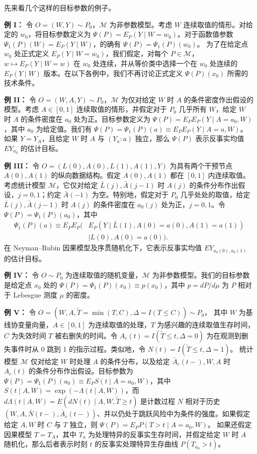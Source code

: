 先来看几个这样的目标参数的例子。

\noindent\textbf{例 I：}\enspace
令 $O=(W,Y)\sim P_0$，$\mathcal M$ 为非参数模型。考虑 $W$ 连续取值的情形。对给定的 $w_0$，将目标参数定义为
$\Psi(P)=E_P(Y\mid W=w_0)$。对于函数值参数
$\Psi_1(P)(W)=E_P(Y\mid W)$，的确有 $\Psi(P)=\Psi_1(P)(w_0)$。
为了在给定点 $w_0$ 处正式定义 $E_P(Y\mid W=w_0)$，我们假定，对每个 $P\in\mathcal M$，
$w\mapsto E_P(Y\mid W=w)$ 在 $w_0$ 处连续，并从等价类中选择一个在 $w_0$ 处连续的 $E_P(Y\mid W)$ 版本。在以下各例中，我们不再讨论正式定义 $\Psi(P)(x_0)$ 所需的技术条件。

\noindent\textbf{例 II：}\enspace
令 $O=(W,A,Y)\sim P_0$，$\mathcal M$ 为仅对给定 $W$ 时 $A$ 的条件密度作出假设的模型。考虑 $A\in[0,1]$ 连续取值的情形，并假定对于 $P_0$ 几乎所有 $W$，给定 $W$ 时 $A$ 的条件密度在 $a_0$ 处为正。目标参数定义为
$\Psi(P)=E_PE_P(Y\mid A=a_0,W)$，其中 $a_0$ 为给定值。我们有
$\Psi(P)=\Psi_1(P)(a)\equiv E_PE_P(Y\mid A=a,W)$。
如果 $Y=Y_A$，且给定 $W$ 时 $A$ 与 $(Y_a:a)$ 独立，那么 $\Psi(P)$ 表示反事实均值 $EY_{a_0}$ 的估计目标。

\noindent\textbf{例 III：}\enspace
令 $O=(L(0),A(0),L(1),A(1),Y)$ 为具有两个干预节点 $A(0),A(1)$ 的纵向数据结构。假定 $A(0),A(1)$ 都在 $[0,1]$ 内连续取值。考虑统计模型 $\mathcal M$，它仅对给定 $\bar L(j),\bar A(j-1)$ 时 $A(j)$ 的条件分布作出假设，$j=0,1$；约定 $\bar A(-1)$ 为空。特别地，假定对于 $P_0$ 几乎处处的取值，给定 $\bar L(j),\bar A(j-1)$ 时 $A(j)$ 的条件密度在 $a_0(j)$ 处为正，$j=0,1$。令 $\Psi(P)=\Psi_1(P)(a_0)$，其中
\[
\begin{aligned}
 \Psi_1(P)(a)\equiv E_PE_P\bigl(&E_P(Y\mid\bar L(1),A(0)=a(0),A(1)=a(1))\\
 &\mid L(0),A(0)=a(0)\bigr).
\end{aligned}
\]
在 Neyman--Rubin 因果模型及序贯随机化下，它表示反事实均值
$EY_{a_0(0),a_0(1)}$ 的估计目标。

\noindent\textbf{例 IV：}\enspace
令 $O\sim P_0$ 为连续取值的随机变量，$\mathcal M$ 为非参数模型。我们的目标参数是给定点 $x_0$ 处的
$\Psi(P)=\Psi_1(P)(x_0)\equiv p(x_0)$，其中
$p=dP/d\mu$ 为 $P$ 相对于 Lebesgue 测度 $\mu$ 的密度。

\noindent\textbf{例 V：}\enspace
令 $O=(W,A,\tilde T=\min(T,C),\Delta=I(T\leq C))\sim P_0$，
其中 $W$ 为基线协变量向量，$A\in[0,1]$ 为连续取值的处理，$T$ 为感兴趣的连续取值生存时间，$C$ 为失效时间 $T$ 被右删失的时间。令
$A_c(t)=I(\tilde T\leq t,\Delta=0)$ 为在观测到删失事件时从 0 跳到 1 的指示过程。类似地，令
$N(t)=I(\tilde T\leq t,\Delta=1)$。
统计模型 $\mathcal M$ 仅对给定 $W$ 时处理 $A$ 的条件分布，以及给定 $\bar A_c(t-),W,A$ 时 $A_c(t)$ 的条件分布作出假设。目标参数为
$\Psi(P)=\Psi_1(P)(a_0)\equiv E_PS(t\mid A=a_0,W)$，其中
$S(t\mid A,W)=\exp(-\Lambda(t\mid A,W))$，而
$d\Lambda(t\mid A,W)=E(dN(t)\mid A,W,\tilde T\geq t)$
是计数过程 $N$ 相对于历史 $(W,A,\bar N(t-),\bar A_c(t-))$、并以仍处于跳跃风险中为条件的强度。如果假定给定 $A,W$ 时 $C$ 与 $T$ 独立，则
$\Psi(P)=E_PP(T>t\mid A=a_0,W)$。
如果还假定因果模型 $T=T_A$，其中 $T_a$ 为处理特异的反事实生存时间，并假定给定 $W$ 时 $A$ 随机化，那么后者表示时刻 $t$ 的反事实处理特异生存曲线 $P(T_{a_0}>t)$。


